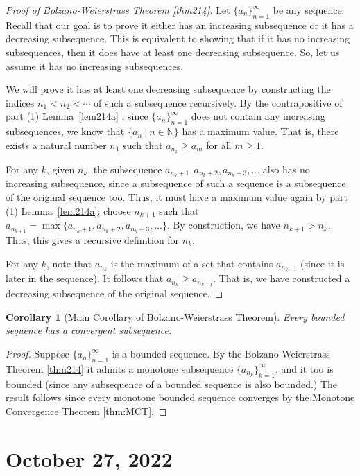 \documentclass[12pt]{amsart}
\newcommand{\N}{\mathbb{N}}
\numberwithin{equation}{section}
\theoremstyle{plain} %
\newtheorem{cor}[equation]{Corollary}
\newcommand{\Oct}[1]{\section{October #1, 2022}}
\theoremstyle{definition}
\theoremstyle{remark}
\begin{document}
\begin{proof}[Proof of Bolzano-Weierstrass Theorem \ref{thm214}]
Let $\{a_n\}_{n=1}^\infty$ be any sequence. Recall that our goal is to prove it either has an increasing subsequence or it has a decreasing subsequence. This is equivalent to showing that if it has no increasing
subsequences, then it does have at least one decreasing subsequence.
So, let us assume it has no increasing subsequences. 


We will prove it has at least one
decreasing subsequence by constructing the indices $n_1<n_2< \cdots$ of such a subsequence recursively. 
By the contrapositive of part (1) Lemma~\ref{lem214a} , since $\{a_n\}_{n=1}^\infty$ does not contain any increasing subsequences, we know that  
$\{ a_n \ | \ n\in \N\}$ has a maximum value. That is,
there exists a natural number $n_1$ such that $a_{n_1}
\geq a_m$ for all $m \geq 1$. 

For any $k$, given $n_k$, the subsequence $a_{n_k +1} , a_{n_k+2},a_{n_k+3},\ldots$ also has no increasing subsequence, since a subsequence of such a sequence is a subsequence of the original sequence too. Thus, it must have a maximum value again by part (1) Lemma~\ref{lem214a}; choose $n_{k+1}$ such that $a_{n_{k+1}} = \max\{ a_{n_k +1} , a_{n_k+2},a_{n_k+3}, \dots\}$. By construction, we have $n_{k+1} > n_k$. Thus, this gives a recursive definition for $n_k$.

For any $k$, note that $a_{n_{k}}$ is the maximum of a set that contains $a_{n_{k+1}}$ (since it is later in the sequence). It follows that $a_{n_k} \geq a_{n_{k+1}}$. That is, we have constructed a decreasing subsequence of the original sequence.
\end{proof}




\begin{cor}[Main Corollary of Bolzano-Weierstrass Theorem] Every bounded sequence has a convergent subsequence.
\end{cor}

\begin{proof} Suppose $\{a_n\}_{n=1}^\infty$ is a bounded sequence. 
By the Bolzano-Weierstrass Theorem \ref{thm214} it admits a monotone subsequence
$\{a_{n_k}\}_{k=1}^\infty$, and it too is bounded (since 
any subsequence of a bounded sequence is also bounded.) 
The result follows since every monotone bounded sequence converges by the Monotone Convergence Theorem \ref{thm:MCT}.
\end{proof}

\Oct{27}
\end{document}
